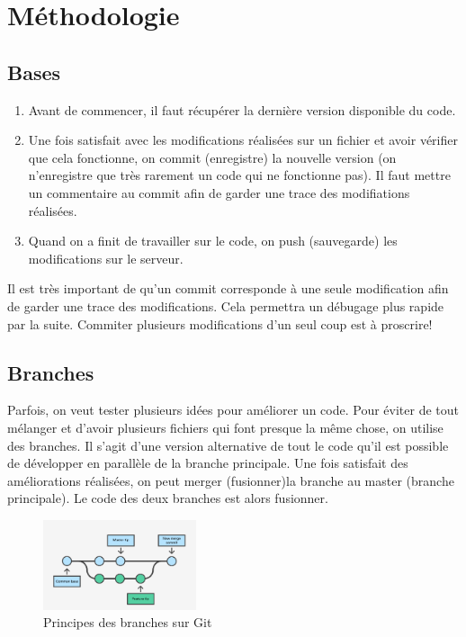\documentclass[a4paper, 11pt]{report}
\begin{document}
\section{Méthodologie}

\subsection{Bases}
\begin{enumerate}
\item Avant de commencer, il faut récupérer la dernière version disponible du code.
\item Une fois satisfait avec les modifications réalisées sur un fichier et avoir vérifier que cela fonctionne, on commit (enregistre) la nouvelle version (on n'enregistre que très rarement un code qui ne fonctionne pas). Il faut mettre un commentaire au commit afin de garder une trace des modifiations réalisées.
\item Quand on a finit de travailler sur le code, on push (sauvegarde)  les modifications sur le serveur.
\end{enumerate}

Il est très important de qu'un commit corresponde à une seule modification afin de garder une trace des modifications. Cela permettra un débugage plus rapide par la suite. Commiter plusieurs modifications d'un seul coup est à proscrire!

\subsection{Branches}
Parfois, on veut tester plusieurs idées pour améliorer un code. Pour éviter de tout mélanger et d'avoir plusieurs fichiers qui font presque la même chose, on utilise des branches. Il s'agit d'une version alternative de tout le code qu'il est possible de développer en parallèle de la branche principale. Une fois satisfait des améliorations réalisées, on peut merger (fusionner)la branche au master (branche principale). Le code des deux branches est alors fusionner.

\begin{figure}[h!]
\begin{centering}
\includegraphics[width=0.4\textwidth]{images/gitBranches.png}
\caption{Principes des branches sur Git}
\par\end{centering}
\end{figure}
\end{document}
